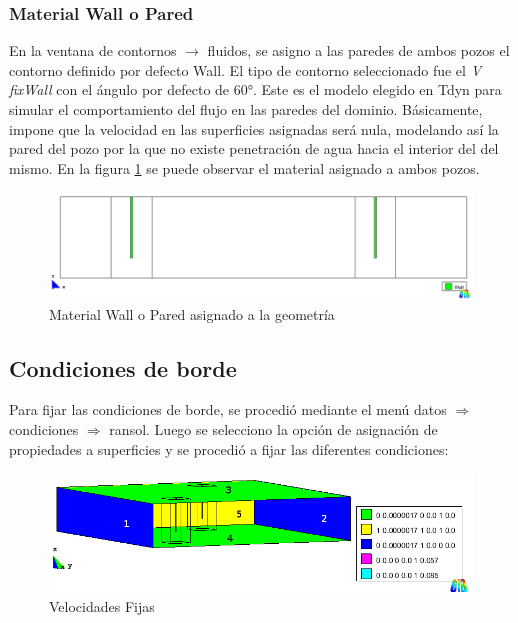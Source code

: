\documentclass[10pt,a4paper,final]{article}
\begin{document}
\subsubsection{Material Wall o Pared}
En la ventana de contornos $\rightarrow$ fluidos, se asigno a las paredes de ambos pozos el contorno definido por defecto Wall. El tipo de contorno seleccionado fue el \emph{V fixWall} con el ángulo por defecto de $60°$. Este es el modelo elegido en Tdyn para simular el comportamiento del flujo en las paredes del dominio. Básicamente, impone que la velocidad en las superficies asignadas será nula, modelando así la pared del pozo por la que no existe penetración de agua hacia el interior del del mismo. En la figura \ref{100_condiciones_vfixwall_xz} se puede observar el material asignado a ambos pozos.
%
\begin{figure}[tbhp]
\centerline{\includegraphics[scale=0.5]{img/100m/100_condiciones_vfixwall_xz}}
\caption{Material Wall o Pared asignado a la geometría}
\label{100_condiciones_vfixwall_xz}
\end{figure}
%
\subsection{Condiciones de borde}
Para fijar las condiciones de borde, se procedió mediante el menú datos $\Rightarrow$ condiciones $\Rightarrow$ ransol. Luego se selecciono la opción de asignación de propiedades a superficies y se procedió a fijar las diferentes condiciones:

\begin{figure}[tbhp]
\centerline{\includegraphics[scale=0.5]{img/100m/100_condiciones_fijar_velocidad_perspectiva_interior_leyendas}}
\caption{Velocidades Fijas}
\label{100_condiciones_fijar_velocidad_perspectiva_interior_leyendas}
\end{figure}
\end{document}
